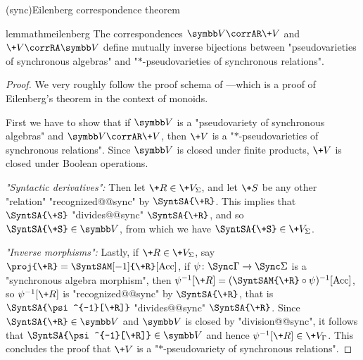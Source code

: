 \AP{}(sync){Eilenberg correspondence theorem}\vspace{-1em}
\begin{restatable}{lemma}{thmeilenberg}
	\AP\label{lem:eilenberg-sy}
	The correspondences $\B{V} \corrAR \+V$ and $\+V \corrRA \B{V}$ define
	mutually inverse bijections between "pseudovarieties of
	synchronous algebras" and "$\ast$-pseudovarieties of synchronous relations".
\end{restatable}

\begin{proof}
	We very roughly follow the proof schema of \cite[\S XIII.4, pp.~226--229]{Pin2022MathematicalFoundations}---which is
	a proof of Eilenberg's theorem in the context of monoids.

	First we have to show that if $\B{V}$ is a "pseudovariety
	of synchronous algebras" and $\B{V} \corrAR \+V$, then $\+V$ is a
	"$\ast$-pseudovarieties of synchronous relations".
	Since $\B{V}$ is closed under finite products, $\+V$ is closed under Boolean operations.

	\emph{"Syntactic derivatives":} Then let $\+R \in \+V_\Sigma$, and let $\+S$ be any other "relation"
	"recognized@@sync" by $\SyntSA{\+R}$. This implies that $\SyntSA{\+S}$
	"divides@@sync" $\SyntSA{\+R}$, and so $\SyntSA{\+S} \in \B{V}$, from which
	we have $\SyntSA{\+S} \in \+V_\Sigma$.

	\emph{"Inverse morphisms":} Lastly, if $\+R \in \+V_\Sigma$, say $\proj{\+R} = \SyntSAM[-1]{\+R}[\Acc]$,
	if $\psi\colon \Sync\Gamma \to \Sync\Sigma$ is a "synchronous algebra morphism",
	then $\psi^{-1}[\+R] = (\SyntSAM{\+R} \circ \psi)^{-1}[\Acc]$, so
	$\psi^{-1}[\+R]$ is "recognized@@sync" by $\SyntSA{\+R}$, that is
	$\SyntSA{\psi^{-1}[\+R]}$ "divides@@sync" $\SyntSA{\+R}$. Since $\SyntSA{\+R} \in \B{V}$
	and $\B{V}$ is closed by "division@@sync", it follows that $\SyntSA{\psi^{-1}[\+R]} \in \B{V}$
	and hence $\psi^{-1}[\+R] \in \+V_{\Gamma}$. 
	This concludes the proof that $\+V$ is a "$\ast$-pseudovariety of synchronous relations".


\end{proof}
